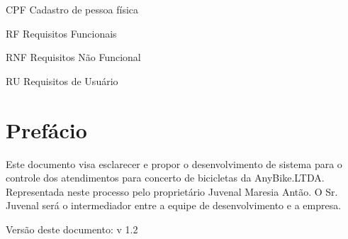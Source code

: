 \documentclass[
	12pt,				%
	openright,
	oneside,			%
	a4paper,			%
	chapter=TITLE,		%
	brazil				%
	]{abntex2}
\begin{document}

\frenchspacing 


\imprimirfolhaderosto

\tableofcontents*
\cleardoublepage


\textual


\listoffigures*
\cleardoublepage

\begin{siglas}
  \item[CPF] Cadastro de pessoa física 
  \item[RF] Requisitos Funcionais
  \item[RNF] Requisitos Não Funcional
  \item[RU] Requisitos de Usuário
  
\end{siglas}



\chapter*{Prefácio}

Este documento visa esclarecer e propor o desenvolvimento de sistema para o controle dos atendimentos para concerto de bicicletas da AnyBike.LTDA. Representada neste processo pelo proprietário Juvenal Maresia Antão. O Sr. Juvenal será o intermediador entre a equipe de desenvolvimento e a empresa. 

Versão deste documento: v 1.2
\end{document}
